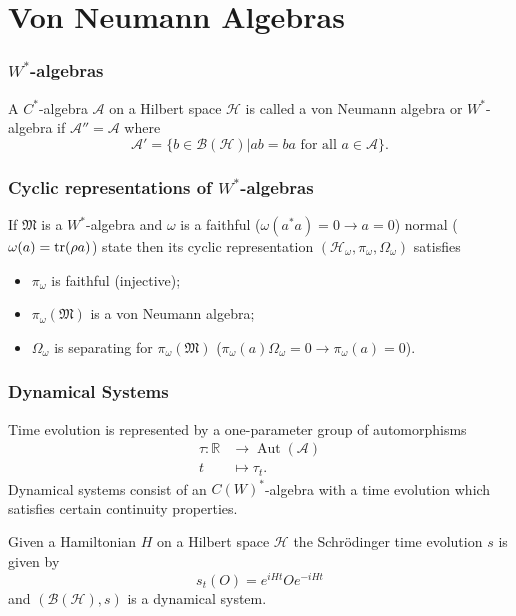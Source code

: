 \documentclass{beamer}
\DeclareMathOperator{\Aut}{Aut}
\begin{document}
\section{Von Neumann Algebras}

\begin{frame}
	\frametitle{$W^*$-algebras}
	\begin{definition}
		A $C^*$-algebra $\mathcal{A}$ on a Hilbert space $\mathcal{H}$ is called a von Neumann algebra or $W^*$-algebra if $\mathcal{A}''=\mathcal{A}$ where 
		\begin{equation}
			\mathcal{A}'=\{b\in\mathcal{B}(\mathcal{H})|ab=ba\text{ for all }a\in\mathcal{A}\}.
		\end{equation}
	\end{definition}
\end{frame}

\begin{frame}
\frametitle{Cyclic representations of $W^*$-algebras}
\begin{theorem}[$\bigstar$]
If $\mathfrak{M}$ is a $W^*$-algebra and $\omega$ is a faithful ($\omega(a^*a)=0\rightarrow a=0$) normal ($\omega(a)=\tr(\rho a)$) state then its cyclic representation $(\mathcal{H}_\omega,\pi_\omega,\Omega_\omega)$ satisfies
\begin{itemize}
	\item $\pi_\omega$ is faithful (injective);
	\item $\pi_\omega(\mathfrak{M})$ is a von Neumann algebra;
	\item $\Omega_\omega$ is separating for $\pi_\omega(\mathfrak{M})$ ($\pi_\omega(a)\Omega_\omega=0\rightarrow\pi_\omega(a)=0$).
\end{itemize}
\end{theorem}
\end{frame}

\begin{frame}
	\frametitle{Dynamical Systems}
	Time evolution is represented by a one-parameter group of automorphisms
	\begin{align*}
		\tau:\mathbb{R}&\rightarrow\Aut(\mathcal{A}) \\
		t&\mapsto\tau_t.
	\end{align*}
	Dynamical systems consist of an $C(W)^*$-algebra with a time evolution which satisfies certain continuity properties.
	\begin{example}
	Given a Hamiltonian $H$ on a Hilbert space $\mathcal{H}$ the Schrödinger time evolution $s$ is given by
	\begin{equation}
	s_t(O)=e^{iHt}O e^{-iHt}
	\end{equation}
	and $(\mathcal{B}(\mathcal{H}),s)$ is a dynamical system.
	\end{example}
\end{frame}
\end{document}
